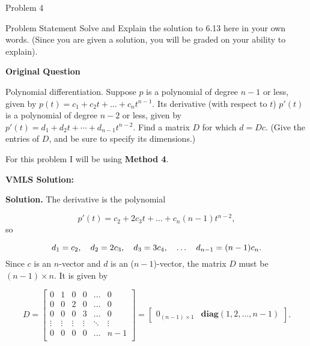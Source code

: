 \begin{problem}{Problem 4}
    \begin{statement}{Problem Statement}
        Solve and Explain the solution to 6.13 here in your own words. (Since you are given a solution, you will be graded on your ability to explain). \vspace*{1em}

        \noindent \textbf{Original Question} \vspace*{1em}

        Polynomial differentiation. Suppose $p$ is a polynomial of degree $n-1$ or less, given by $p(t) = c_{1} + c_{2}t + \dots + c_{n}t^{n-1}$. Its derivative (with respect to $t$) $p'(t)$ is a 
        polynomial of degree $n-2$ or less, given by $p'(t) = d_{1} + d_{2}t + \cdots + d_{n-1}t^{n-2}$. Find a matrix $D$ for which $d = Dc$. (Give the entries of $D$, and be sure to specify its dimensions.)
    \end{statement}

    \begin{Highlight}[Solution]
        For this problem I will be using \textbf{Method 4}. \vspace*{1em}

        \noindent \textbf{VMLS Solution:} \vspace*{1em}

        \textbf{Solution.} The derivative is the polynomial

        \begin{equation*}
            p'(t) = c_{2} + 2c_{3}t + \dots + c_{n}(n-1)t^{n-2},
        \end{equation*}
        so

        \begin{equation*}
            d_{1} = c_{2}, \hspace*{10pt} d_{2} = 2c_{3}, \hspace*{10pt} d_{3} = 3c_{4}, \hspace*{10pt} \dots \hspace*{10pt} d_{n-1}=(n-1)c_{n}.
        \end{equation*}
        Since $c$ is an $n$-vector and $d$ is an ($n-1$)-vector, the matrix $D$ must be $(n-1)\times n$. It is given by

        \begin{equation*}
            D = 
            \begin{bmatrix}
                0 & 1 & 0 & 0 & \dots & 0 \\
                0 & 0 & 2 & 0 & \dots & 0 \\
                0 & 0 & 0 & 3 & \dots & 0 \\
                \vdots & \vdots & \vdots & \vdots & \ddots & \vdots \\
                0 & 0 & 0 & 0 & \dots & n - 1 \\
            \end{bmatrix}
            = 
            \begin{bmatrix}
                0_{(n-1)\times 1} & \mathbf{diag}(1,2,\dots,n-1)
            \end{bmatrix}.
        \end{equation*}


\end{Highlight}
\end{problem}
